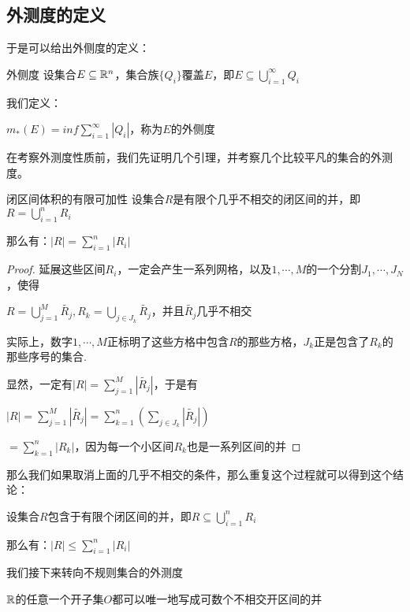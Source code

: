 \documentclass[12pt, a4paper, oneside, UTF8]{ctexbook}
\begin{document}
			\subsection{外测度的定义}
			于是可以给出外侧度的定义：
			\begin{defn}{外侧度}{}
				设集合$E \subseteq \mathbb{R}^n$，集合族$\{Q_i\}$覆盖$E$，即$E \subseteq \bigcup\limits_{i=1}^{\infty} Q_i$
				
				我们定义：
				
				$m_*(E) = inf \sum\limits_{i=1}^{\infty} |Q_i|$，称为$E$的外侧度
			\end{defn}
			在考察外测度性质前，我们先证明几个引理，并考察几个比较平凡的集合的外测度。
			\begin{lemma}{闭区间体积的有限可加性}{}
				设集合$R$是有限个几乎不相交的闭区间的并，即$R = \bigcup\limits_{i=1}^{n} R_i$
				
				那么有：$|R| = \sum\limits_{i=1}^{n} |R_i|$
			\end{lemma}
			\begin{proof}
				延展这些区间$R_i$，一定会产生一系列网格，以及${1,\cdots,M}$的一个分割$J_1,\cdots,J_N$，使得
				
				$R = \bigcup_{j=1}^{M} \tilde{R_j},R_k = \bigcup_{j \in J_k} \tilde{R_j}$，并且$\tilde{R_j}$几乎不相交
				
				实际上，数字$1,\cdots,M$正标明了这些方格中包含$R$的那些方格，$J_k$正是包含了$R_k$的那些序号的集合.
				
				显然，一定有$|R|=\sum\limits_{j=1}^{M} |\tilde{R_j}|$，于是有
				
				$|R| = \sum\limits_{j=1}^{M} |\tilde{R_j}| = \sum\limits_{k=1}^{n} \left(\sum\limits_{j \in J_k} |\tilde{R_j}|\right)$
				
				$=\sum\limits_{k=1}^{n} |R_k|$，因为每一个小区间$R_k$也是一系列区间的并
			\end{proof}
			那么我们如果取消上面的几乎不相交的条件，那么重复这个过程就可以得到这个结论：
			\begin{corollary}{}{}
				设集合$R$包含于有限个闭区间的并，即$R  \subseteq \bigcup\limits_{i=1}^{n} R_i$
				
				那么有：$|R| \leqslant \sum\limits_{i=1}^{n} |R_i|$
			\end{corollary}
			我们接下来转向不规则集合的外测度
			\begin{them}{}{}
				$\mathbb{R}$的任意一个开子集$O$都可以唯一地写成可数个不相交开区间的并
			\end{them}
\end{document}
